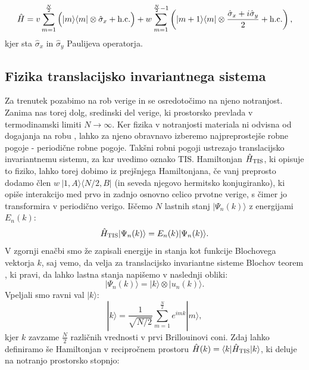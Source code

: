 \begin{equation}
\hat{H} = v \sum_{m=1}^{\frac{N}{2}} \Big( |m \rangle \langle m| \otimes \hat{\sigma}_x +\textup{h.c.} \Big) + w \sum_{m=1}^{\frac{N}{2}-1} \left( | m+1\rangle \langle m | \otimes \frac{\hat{\sigma}_x + i \hat{\sigma}_y}{2} + \textup{h.c.} \right),
\end{equation}
kjer sta $\hat{\sigma}_x$ in $\hat{\sigma}_y$ Paulijeva operatorja.

\subsection{Fizika translacijsko invariantnega sistema} \label{spomnimoTIS}
Za trenutek pozabimo na rob verige in se osredotočimo na njeno notranjost. Zanima nas torej dolg, sredinski del verige, ki prostorsko prevlada v termodinamski limiti $N \to \infty$. Ker fizika v notranjosti materiala ni odvisna od dogajanja na robu \cite{ashcroft}, lahko za njeno obravnavo izberemo najpreprostejše robne pogoje - periodične robne pogoje. Takšni robni pogoji ustrezajo translacijsko invariantnemu sistemu, za kar uvedimo oznako TIS. Hamiltonjan $\hat{H}_{\textup{TIS}}$, ki opisuje to fiziko, lahko torej dobimo iz prejšnjega Hamiltonjana, če vanj preprosto dodamo člen $w\ | 1, A \rangle \langle N/2, B|$  (in seveda njegovo hermitsko konjugiranko), ki opiše interakcijo med prvo in zadnjo osnovno celico prvotne verige, s čimer jo transformira v periodično verigo.
Iščemo $N$ lastnih stanj $|\Psi_n (k) \rangle$ z energijami $E_n(k)$:
\begin{equation}
\hat{H}_{\textup{TIS}} | \Psi_n (k) \rangle = E_n(k) | \Psi_n(k) \rangle.
\end{equation} 
V zgornji enačbi smo že zapisali energije in stanja kot funkcije Blochovega vektorja $k$, saj vemo, da velja za translacijsko invariantne sisteme Blochov teorem \cite{ashcroft}, ki pravi, da lahko lastna stanja napišemo v naslednji obliki:
\begin{equation}
| \Psi_n (k) \rangle = | k \rangle \otimes | u_n (k) \rangle.
\end{equation}
Vpeljali smo ravni val $|k\rangle$:
\begin{equation}
|k \rangle = \frac{1}{\sqrt{N/2}} \sum_{m=1}^{\frac{N}{2}} e^{imk} |m \rangle,
\end{equation}
kjer $k$ zavzame $\frac{N}{2}$ različnih vrednosti v prvi Brillouinovi coni.
Zdaj lahko definiramo še Hamiltonjan v recipročnem prostoru $\hat{H}(k) = \langle k | \hat{H}_{\textup{TIS}} | k \rangle$, ki deluje na notranjo prostorsko stopnjo:
